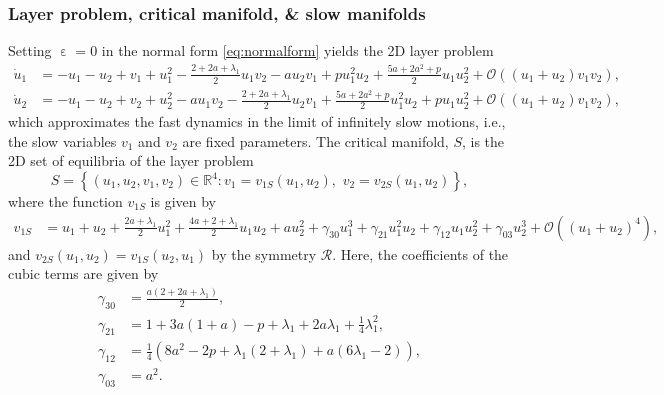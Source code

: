 \documentclass[10pt,onecolumn]{article}
\theoremstyle{plain}
\DeclareMathOperator{\eps}{\varepsilon}
\begin{document}
\subsubsection{Layer problem, critical manifold, \& slow manifolds}
Setting $\eps = 0$ in the normal form \eqref{eq:normalform} yields the 2D layer problem
%
\begin{equation} \label{eq:layernf}
  \begin{split}
    \dot u_1 &= -u_1-u_2+v_1+u_1^2-\tfrac{2+2a+\lambda_1}{2} u_1 v_2 - a u_2 v_1 + p u_1^2 u_2 + \tfrac{5a+2a^2+p}{2} u_1 u_2^2 + \mathcal O\left( (u_1+u_2) v_1 v_2 \right), \\
    \dot u_2 &= -u_1-u_2+v_2+u_2^2 -a u_1 v_2 - \tfrac{2+2a+\lambda_1}{2} u_2 v_1 + \tfrac{5a+2a^2+p}{2} u_1^2 u_2 + p u_1 u_2^2 + \mathcal O\left( (u_1+u_2) v_1 v_2 \right),
  \end{split}
\end{equation}
%
which approximates the fast dynamics in the limit of infinitely slow motions, i.e., the slow variables $v_1$ and $v_2$ are fixed parameters. 
The critical manifold, $S$, is the 2D set of equilibria of the layer problem
%
\[ S = \left\{ (u_1,u_2,v_1,v_2) \in \mathbb R^4 : v_1= v_{1S}(u_1,u_2), \,\, v_2 = v_{2S}(u_1,u_2) \right\}, \]
%
where the function $v_{1S}$ is given by 
%
\begin{equation*}
  \begin{split}
    v_{1S} &= u_1+u_2+\tfrac{2a+\lambda_1}{2}u_1^2 + \tfrac{4a+2+\lambda_1}{2}u_1 u_2 + a u_2^2+\gamma_{30} u_1^3 + \gamma_{21} u_1^2 u_2 + \gamma_{12} u_1 u_2^2 + \gamma_{03} u_2^3+\mathcal O \left( (u_1+u_2)^4 \right), 
  \end{split}
\end{equation*}
%
and $v_{2S}(u_1,u_2) = v_{1S}(u_2,u_1)$ by the symmetry $\mathcal R$.
Here, the coefficients of the cubic terms are given by
%
\begin{equation*}
  \begin{split}
\gamma_{30} &= \tfrac{a(2+2a+\lambda_1)}{2}, \\
\gamma_{21} &= 1+3a(1+a)-p+\lambda_1+2a \lambda_1 + \tfrac{1}{4}\lambda_1^2, \\
\gamma_{12} &= \tfrac{1}{4} \left( 8a^2-2p+\lambda_1(2+\lambda_1)+a(6\lambda_1-2) \right), \\
\gamma_{03} &= a^2.
  \end{split}
\end{equation*}
%
\end{document}
